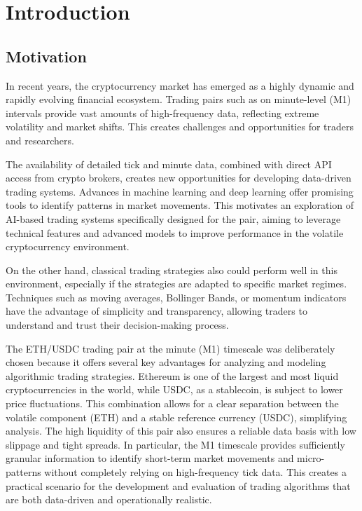 \section{Introduction}

\subsection{Motivation}

In recent years, the cryptocurrency market has emerged as a highly dynamic and rapidly evolving financial ecosystem.
Trading pairs such as \ethusdc on minute-level (M1) intervals provide vast amounts of high-frequency data, reflecting extreme volatility and market shifts.
This creates challenges and opportunities for traders and researchers.

The availability of detailed tick and minute data, combined with direct API access from crypto brokers, creates new opportunities for developing data-driven trading systems.
Advances in machine learning and deep learning offer promising tools to identify patterns in market movements.
This motivates an exploration of AI-based trading systems specifically designed for the \ethusdc pair, aiming to leverage technical features and advanced models to improve performance in the volatile cryptocurrency environment.

On the other hand, classical trading strategies also could perform well in this environment, especially if the strategies are adapted to specific market regimes.
Techniques such as moving averages, Bollinger Bands, or momentum indicators have the advantage of simplicity and transparency, allowing traders to understand and trust their decision-making process.

The ETH/USDC trading pair at the minute (M1) timescale was deliberately chosen because it offers several key advantages for analyzing and modeling algorithmic trading strategies.
Ethereum is one of the largest and most liquid cryptocurrencies in the world, while USDC, as a stablecoin, is subject to lower price fluctuations.
This combination allows for a clear separation between the volatile component (ETH) and a stable reference currency (USDC), simplifying analysis.
The high liquidity of this pair also ensures a reliable data basis with low slippage and tight spreads.
In particular, the M1 timescale provides sufficiently granular information to identify short-term market movements and micro-patterns without completely relying on high-frequency tick data.
This creates a practical scenario for the development and evaluation of trading algorithms that are both data-driven and operationally realistic.


